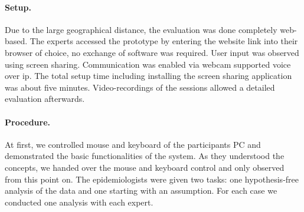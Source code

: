 \documentclass[journal]{style/vgtc} 			          %
\begin{document}
\paragraph{Setup.} Due to the large geographical distance, the evaluation was done completely web-based.
%
The experts accessed the prototype by entering the website link into their browser of choice, no exchange of software was required.
%
%
User input was observed using screen sharing.
%
Communication was enabled via webcam supported voice over ip.
%
The total setup time including installing the screen sharing application was about five minutes.
%
Video-recordings of the sessions allowed a detailed evaluation afterwards.%
%
\paragraph{Procedure.}
At first, we controlled mouse and keyboard of the participants PC and demonstrated the basic functionalities of the system.
%
%
As they understood the concepts, we handed over the mouse and keyboard control and only observed from this point on.
%
The epidemiologists were given two tasks: one hypothesis-free analysis of the data and one starting with an assumption.
%
For each case we conducted one analysis with each expert.

\end{document}
